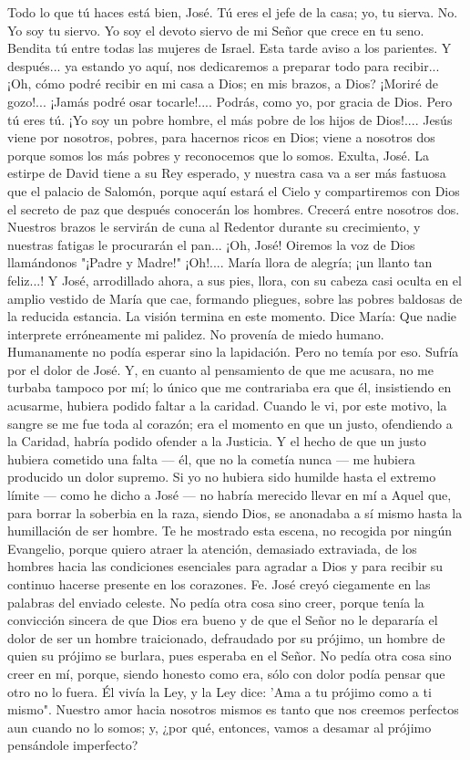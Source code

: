 \documentclass[12pt]{book} %
\begin{document}
Todo lo que tú haces está bien, José. Tú eres el jefe de la casa; yo, tu sierva. 
No. Yo soy tu siervo. Yo soy el devoto siervo de mi Señor que crece en tu seno. Bendita tú entre todas las mujeres de Israel. Esta tarde aviso a los parientes. Y después... ya estando yo aquí, nos dedicaremos a preparar todo para recibir... ¡Oh, cómo podré recibir en mi casa a Dios; en mis brazos, a Dios? ¡Moriré de gozo!... ¡Jamás podré osar tocarle!.... 
Podrás, como yo, por gracia de Dios. 
Pero tú eres tú. ¡Yo soy un pobre hombre, el más pobre de los hijos de Dios!.... 
Jesús viene por nosotros, pobres, para hacernos ricos en Dios; viene a nosotros dos porque somos los más pobres y 
reconocemos que lo somos. Exulta, José. La estirpe de David tiene a su Rey esperado, y nuestra casa va a ser más fastuosa que el palacio de Salomón, porque aquí estará el Cielo y compartiremos con Dios el secreto de paz que después conocerán los hombres. Crecerá entre nosotros dos. Nuestros brazos le servirán de cuna al Redentor durante su crecimiento, y nuestras fatigas le procurarán el pan... ¡Oh, José! Oiremos la voz de Dios llamándonos "¡Padre y Madre!" ¡Oh!.... 
María llora de alegría; ¡un llanto tan feliz...! Y José, arrodillado ahora, a sus pies, llora, con su cabeza casi oculta en el 
amplio vestido de María que cae, formando pliegues, sobre las pobres baldosas de la reducida estancia. La visión termina en este momento. 
Dice María:                         
Que nadie interprete erróneamente mi palidez. No provenía de miedo humano. Humanamente no podía esperar sino 
la lapidación. Pero no temía por eso. Sufría por el dolor de José. Y, en cuanto al pensamiento de que me acusara, no me turbaba tampoco por mí; lo único que me contrariaba era que él, insistiendo en acusarme, hubiera podido faltar a la caridad. Cuando le vi, por este motivo, la sangre se me fue toda al corazón; era el momento en que un justo, ofendiendo a la Caridad, habría podido ofender a la Justicia. Y el hecho de que un justo hubiera cometido una falta — él, que no la cometía nunca — me hubiera producido un dolor supremo. 
Si yo no hubiera sido humilde hasta el extremo límite — como he dicho a José — no habría merecido llevar en mí a Aquel que, para borrar la soberbia en la raza, siendo Dios, se anonadaba a sí mismo hasta la humillación de ser hombre. 
Te he mostrado esta escena, no recogida por ningún Evangelio, porque quiero atraer la atención, demasiado extraviada, de los hombres hacia las condiciones esenciales para agradar a Dios y para recibir su continuo hacerse presente en los corazones. 
Fe. José creyó ciegamente en las palabras del enviado celeste. No pedía otra cosa sino creer, porque tenía la convicción sincera de que Dios era bueno y de que el Señor no le depararía el dolor de ser un hombre traicionado, defraudado por su prójimo, un hombre de quien su prójimo se burlara, pues esperaba en el Señor. No pedía otra cosa sino creer en mí, porque, siendo honesto como era, sólo con dolor podía pensar que otro no lo fuera. Él vivía la Ley, y la Ley dice: 'Ama a tu prójimo como a ti mismo". Nuestro amor hacia nosotros mismos es tanto que nos creemos perfectos aun cuando no lo somos; y, ¿por qué, entonces, vamos a desamar al prójimo pensándole imperfecto? 
\end{document}
